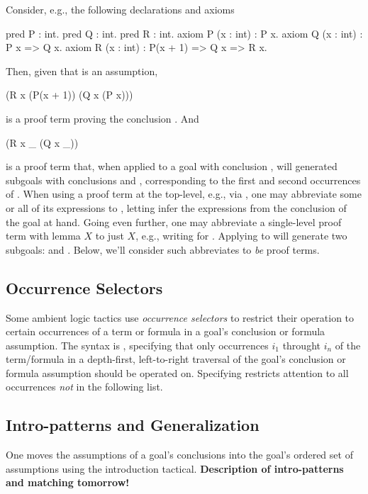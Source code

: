 Consider, e.g., the following declarations and axioms
\begin{easycrypt}{}{}
pred P : int.
pred Q : int.
pred R : int.
axiom P (x : int) : P x.
axiom Q (x : int) : P x => Q x.
axiom R (x : int) : P(x + 1) => Q x => R x.
\end{easycrypt}
Then, given that  is an assumption,
\begin{easycrypt}{}{}
(R x (P(x + 1)) (Q x (P x)))
\end{easycrypt}
is a proof term proving the conclusion . And
\begin{easycrypt}{}{}
(R x _ (Q x _))
\end{easycrypt}
is a proof term that, when applied to a goal with conclusion ,
will generated subgoals with conclusions  and ,
corresponding to the first and second occurrences of \ec{_}.  When
using a proof term at the top-level, e.g., via , one may
abbreviate some or all of its expressions to \ec{_}, letting
\EasyCrypt infer the expressions from the conclusion of the goal at
hand. Going even further, one may abbreviate a single-level proof term
with lemma $X$ to just $X$, e.g., writing  for .
Applying  to  will generate two subgoals: 
and . Below, we'll consider such abbreviates to \emph{be} proof
terms.

\subsection{Occurrence Selectors}
\label{subsec:occsels}

Some ambient logic tactics use \emph{occurrence selectors} to restrict
their operation to certain occurrences of a term or formula in a
goal's conclusion or formula assumption. The syntax is , specifying that only occurrences $i_1$
throught $i_n$ of the term/formula in a depth-first, left-to-right
traversal of the goal's conclusion or formula assumption should be
operated on. Specifying 
restricts attention to all occurrences \emph{not} in the following
list.

\subsection{Intro-patterns and Generalization}
\label{subsec:intropatterns}

One moves the assumptions of a goal's conclusions into the goal's
ordered set of assumptions using the introduction tactical.
\textbf{Description of intro-patterns and matching tomorrow!}

